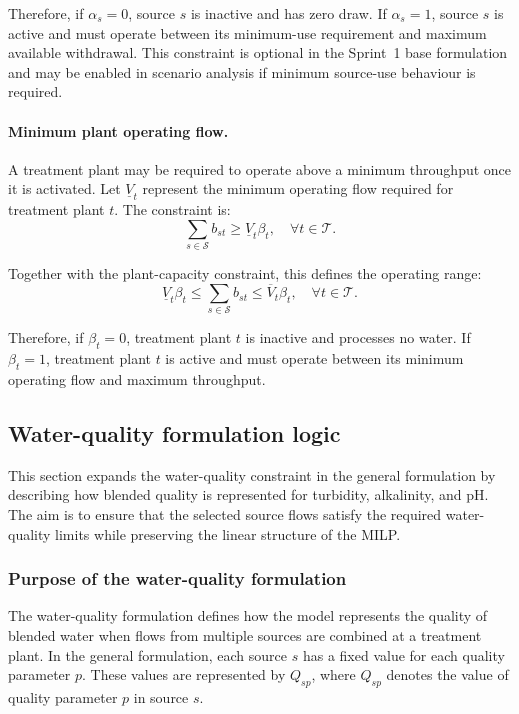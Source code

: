 \documentclass[10pt]{article}
\begin{document}
Therefore, if $\alpha_s=0$, source $s$ is inactive and has zero draw. If
$\alpha_s=1$, source $s$ is active and must operate between its minimum-use
requirement and maximum available withdrawal. This constraint is optional in the
Sprint~1 base formulation and may be enabled in scenario analysis if minimum
source-use behaviour is required.

\paragraph{Minimum plant operating flow.}
A treatment plant may be required to operate above a minimum throughput once it
is activated. Let $\underline{V}_t$ represent the minimum operating flow required
for treatment plant $t$. The constraint is:
\begin{equation}
    \sum_{s \in \mathcal{S}} b_{st}
    \geq
    \underline{V}_t\beta_t,
    \quad \forall t \in \mathcal{T}.
\end{equation}

Together with the plant-capacity constraint, this defines the operating range:
\begin{equation}
    \underline{V}_t\beta_t
    \leq
    \sum_{s \in \mathcal{S}} b_{st}
    \leq
    \overline{V}_t\beta_t,
    \quad \forall t \in \mathcal{T}.
\end{equation}

Therefore, if $\beta_t=0$, treatment plant $t$ is inactive and processes no water.
If $\beta_t=1$, treatment plant $t$ is active and must operate between its
minimum operating flow and maximum throughput.

\subsection{Water-quality formulation logic}

This section expands the water-quality constraint in the general formulation by
describing how blended quality is represented for turbidity, alkalinity, and pH.
The aim is to ensure that the selected source flows satisfy the required
water-quality limits while preserving the linear structure of the MILP.

\subsubsection{Purpose of the water-quality formulation}

The water-quality formulation defines how the model represents the quality of
blended water when flows from multiple sources are combined at a treatment plant.
In the general formulation, each source $s$ has a fixed value for each quality
parameter $p$. These values are represented by $Q_{sp}$, where $Q_{sp}$ denotes
the value of quality parameter $p$ in source $s$.
\end{document}
